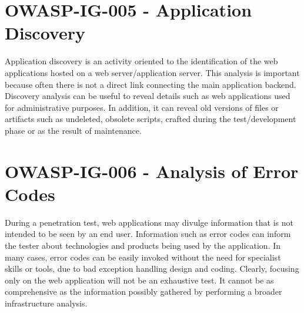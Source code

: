 		\section{OWASP-IG-005 - Application Discovery}
		Application discovery is an activity oriented to the identification of the web applications hosted on a web server/application
		server. This analysis is important because often there is not a direct link connecting the main application backend. Discovery
		analysis can be useful to reveal details such as web applications used for administrative purposes. In addition, it can reveal old versions of files or artifacts such as undeleted, obsolete scripts, crafted during the test/development phase or as the
		result of maintenance.

		\section{OWASP-IG-006 - Analysis of Error Codes}
		During a penetration test, web applications may divulge information that is not intended to be seen by an end user.
		Information such as error codes can inform the tester about technologies and products being used by the application.
		In many cases, error codes can be easily invoked without the need for specialist skills or tools, due to bad exception
		handling design and coding.
		Clearly, focusing only on the web application will not be an exhaustive test. It cannot be as comprehensive as the
		information possibly gathered by performing a broader infrastructure analysis.

